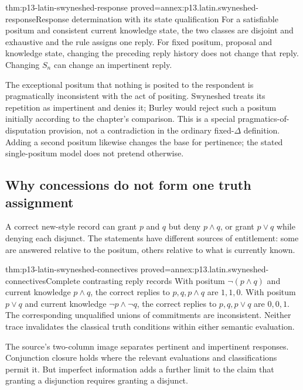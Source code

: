 \begin{hblemma}{thm:p13-latin-swyneshed-response}
 {proved=annex:p13.latin.swyneshed-response}{Response determination with its state qualification}
For a satisfiable positum and consistent current knowledge state, the two
classes are disjoint and exhaustive and the rule assigns one reply.
For fixed positum, proposal and knowledge state, changing the preceding
reply history does not change that reply. Changing \(S_n\) can change
an impertinent reply.
\end{hblemma}

The exceptional positum that nothing is posited to the respondent is
pragmatically inconsistent with the act of positing. Swyneshed treats
its repetition as impertinent and denies it; Burley would reject such
a positum initially according to the chapter's comparison.
This is a special pragmatics-of-disputation provision, not a contradiction
in the ordinary fixed-\(\Delta\) definition.
Adding a second positum likewise changes the base for pertinence;
the stated single-positum model does not pretend otherwise.

\subsection{Why concessions do not form one truth assignment}

A correct new-style record can grant \(p\) and \(q\) but deny \(p\land q\),
or grant \(p\lor q\) while denying each disjunct.
The statements have different sources of entitlement: some are answered
relative to the positum, others relative to what is currently known.

\begin{hblemma}{thm:p13-latin-swyneshed-connectives}
 {proved=annex:p13.latin.swyneshed-connectives}{Complete contrasting reply records}
With positum \(\neg(p\land q)\) and current knowledge \(p\land q\),
the correct replies to \(p,q,p\land q\) are \(1,1,0\).
With positum \(p\lor q\) and current knowledge \(\neg p\land\neg q\),
the correct replies to \(p,q,p\lor q\) are \(0,0,1\).
The corresponding unqualified unions of commitments are inconsistent.
Neither trace invalidates the classical truth conditions within either
semantic evaluation.
\end{hblemma}

The source's two-column image separates pertinent and impertinent responses.
Conjunction closure holds where the relevant evaluations and classifications
permit it. But imperfect information adds a further limit to the claim
that granting a disjunction requires granting a disjunct.

